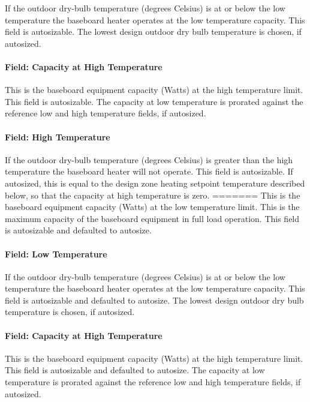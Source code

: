 If the outdoor dry-bulb temperature (degrees Celsius) is at or below the low temperature the baseboard heater operates at the low temperature capacity. This field is autosizable. The lowest design outdoor dry bulb temperature is chosen, if autosized.

\paragraph{Field: Capacity at High Temperature}\label{field-capacity-at-high-temperature}

This is the baseboard equipment capacity (Watts) at the high temperature limit. This field is autosizable. The capacity at low temperature is prorated against the reference low and high temperature fields, if autosized.

\paragraph{Field: High Temperature}\label{field-high-temperature}

If the outdoor dry-bulb temperature (degrees Celsius) is greater than the high temperature the baseboard heater will not operate. This field is autosizable. If autosized, this is equal to the design zone heating setpoint temperature described below, so that the capacity at high temperature is zero.
=======
This is the baseboard equipment capacity (Watts) at the low temperature limit. This is the maximum capacity of the baseboard equipment in full load operation. This field is autosizable and defaulted to autosize.

\paragraph{Field: Low Temperature}\label{field-low-temperature}

If the outdoor dry-bulb temperature (degrees Celsius) is at or below the low temperature the baseboard heater operates at the low temperature capacity. This field is autosizable and defaulted to autosize. The lowest design outdoor dry bulb temperature is chosen, if autosized.

\paragraph{Field: Capacity at High Temperature}\label{field-capacity-at-high-temperature}

This is the baseboard equipment capacity (Watts) at the high temperature limit. This field is autosizable and defaulted to autosize. The capacity at low temperature is prorated against the reference low and high temperature fields, if autosized.

